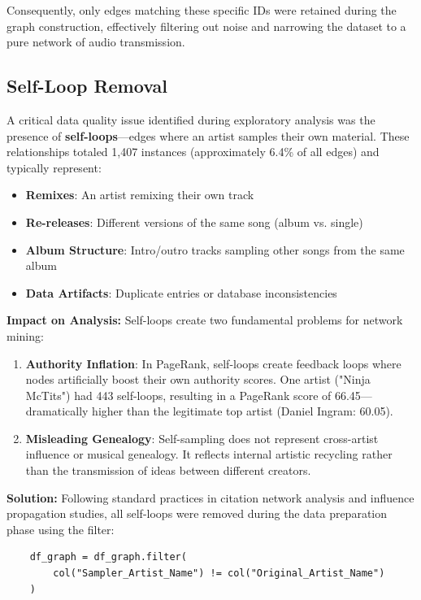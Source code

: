 \documentclass[a4paper, 12pt]{article}
\begin{document}
Consequently, only edges matching these specific IDs were retained during the graph construction, effectively filtering out noise and narrowing the dataset to a pure network of audio transmission.

\subsection{Self-Loop Removal}
A critical data quality issue identified during exploratory analysis was the presence of \textbf{self-loops}—edges where an artist samples their own material. These relationships totaled 1,407 instances (approximately 6.4\% of all edges) and typically represent:

\begin{itemize}
    \item \textbf{Remixes}: An artist remixing their own track
    \item \textbf{Re-releases}: Different versions of the same song (album vs. single)
    \item \textbf{Album Structure}: Intro/outro tracks sampling other songs from the same album
    \item \textbf{Data Artifacts}: Duplicate entries or database inconsistencies
\end{itemize}

\noindent\textbf{Impact on Analysis:} Self-loops create two fundamental problems for network mining:

\begin{enumerate}
    \item \textbf{Authority Inflation}: In PageRank, self-loops create feedback loops where nodes artificially boost their own authority scores. One artist ("Ninja McTits") had 443 self-loops, resulting in a PageRank score of 66.45—dramatically higher than the legitimate top artist (Daniel Ingram: 60.05).
    \item \textbf{Misleading Genealogy}: Self-sampling does not represent cross-artist influence or musical genealogy. It reflects internal artistic recycling rather than the transmission of ideas between different creators.
\end{enumerate}

\noindent\textbf{Solution:} Following standard practices in citation network analysis and influence propagation studies, all self-loops were removed during the data preparation phase using the filter:

\begin{listing}[H]
    \begin{verbatim}
    df_graph = df_graph.filter(
        col("Sampler_Artist_Name") != col("Original_Artist_Name")
    )
    \end{verbatim}
    \caption{Code Snippet: Self-Loop Removal}
\end{listing}
\end{document}
